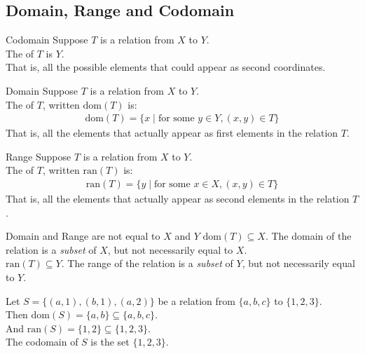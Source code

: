 \documentclass[\main/notes.tex]{subfiles}
\begin{document}
			\subsection{Domain, Range and Codomain}
			\begin{definition}{Codomain}
				Suppose $T$ is a relation from $X$ to $Y$.\\
				The  of $T$ is $Y$.\\
				That is, all the possible elements that could appear as second coordinates.
			\end{definition}
			\begin{definition}{Domain}
				Suppose $T$ is a relation from $X$ to $Y$.\\
				The  of $T$, written $\mathrm{dom}(T)$ is:
					\begin{align*}
						\mathrm{dom}(T) = \{x \mid \text{for some } y \in Y, (x, y) \in T\}
					\end{align*}
				That is, all the elements that actually appear as first elements in the relation $T$.
			\end{definition}
			\begin{definition}{Range}
				Suppose $T$ is a relation from $X$ to $Y$.\\
				The  of $T$, written $\mathrm{ran}(T)$ is:
					\begin{align*}
						\mathrm{ran}(T) = \{y \mid \text{for some } x \in X, (x, y) \in T\}
					\end{align*}
				That is, all the elements that actually appear as second elements in the relation $T$.
			\end{definition}
			\begin{sidenote}{Domain and Range are not equal to $X$ and $Y$}
				$\mathrm{dom}(T) \subseteq X$. The domain of the relation is a \emph{subset} of $X$, but not necessarily equal to $X$.\\
				$\mathrm{ran}(T) \subseteq Y$. The range of the relation is a \emph{subset} of $Y$, but not necessarily equal to $Y$.
			\end{sidenote}
			\begin{example}[width=0.83\textwidth]
				Let $S = \bigl\{(a, 1), (b, 1), (a, 2)\bigr\}$ be a relation from $\{a, b, c\}$ to $\{1, 2, 3\}$.\\
				Then $\mathrm{dom}(S) = \{a, b\} \subseteq \{a, b, c\}$.\\
				And $\mathrm{ran}(S) = \{1, 2\} \subseteq \{1, 2, 3\}$.\\
				The codomain of $S$ is the set $\{1, 2, 3\}$. 
			\end{example}
\end{document}
